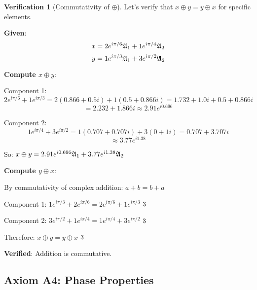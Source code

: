 \documentclass[12pt,a4paper]{article}
\newcommand{\checkmark}{\ding{51}}
\theoremstyle{definition}
\newtheorem{verification}{Verification}[section]
\theoremstyle{remark}
\begin{document}
\begin{verification}[Commutativity of $\oplus$]
Let's verify that $x \oplus y = y \oplus x$ for specific elements.

\textbf{Given}:
$$x = 2e^{i\pi/6} \mathfrak{A}_{1} + 1e^{i\pi/4} \mathfrak{A}_{2}$$
$$y = 1e^{i\pi/3} \mathfrak{A}_{1} + 3e^{i\pi/2} \mathfrak{A}_{2}$$

\textbf{Compute $x \oplus y$}:

Component 1:
$$2e^{i\pi/6} + 1e^{i\pi/3} = 2(0.866 + 0.5i) + 1(0.5 + 0.866i) = 1.732 + 1.0i + 0.5 + 0.866i$$
$$= 2.232 + 1.866i \approx 2.91e^{i0.696}$$

Component 2:
$$1e^{i\pi/4} + 3e^{i\pi/2} = 1(0.707 + 0.707i) + 3(0 + 1i) = 0.707 + 3.707i$$
$$\approx 3.77e^{i1.38}$$

So: $x \oplus y = 2.91e^{i0.696} \mathfrak{A}_{1} + 3.77e^{i1.38} \mathfrak{A}_{2}$

\textbf{Compute $y \oplus x$}:

By commutativity of complex addition: $a + b = b + a$

Component 1: $1e^{i\pi/3} + 2e^{i\pi/6} = 2e^{i\pi/6} + 1e^{i\pi/3}$ $\checkmark$

Component 2: $3e^{i\pi/2} + 1e^{i\pi/4} = 1e^{i\pi/4} + 3e^{i\pi/2}$ $\checkmark$

Therefore: $x \oplus y = y \oplus x$ $\checkmark$

\textbf{Verified}: Addition is commutative.
\end{verification}

\subsection{Axiom A4: Phase Properties}
\end{document}
